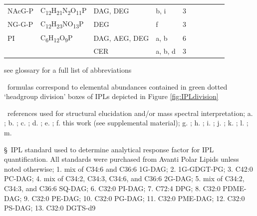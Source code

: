 \begin{landscape}
\begin{table}
\begin{adjustbox}{width=\textheight,keepaspectratio}
\begin{threeparttable}
\begin{tabular}{lrllcrrrrr}
NAcG-P & \multicolumn{1}{l}{C\textsubscript{12}H\textsubscript{21}N\textsubscript{2}O\textsubscript{11}P} & DAG, DEG & b, i  & 3     &       &       &       &       &  \\
NG-G-P & \multicolumn{1}{l}{C\textsubscript{12}H\textsubscript{23}NO\textsubscript{13}P} & DEG   & f     & 3     &       &       &       &       &  \\
PI    & \multicolumn{1}{l}{C\textsubscript{6}H\textsubscript{12}O\textsubscript{9}P} & DAG, AEG, DEG & a, b  & 6     &       &       &       &       &  \\
      &       & CER   & a, b, d & 3     &       &       &       &       &  \\
\bottomrule
\end{tabular}%


\begin{tablenotes}
\small
\item * see glossary for a full list of abbreviations
\item \dag~formulas correspond to elemental abundances contained in green dotted `headgroup division' boxes of IPLs depicted in Figure \ref{fig:IPLdivision}
\item \ddag~references used for structural elucidation and/or mass spectral interpretation; a. \cite{Sturt_Intact_2004}; b. \cite{schubotz2013spatial}
; c. \cite{Yoshinaga_Systematic_2011}; d. \cite{karlsson1998molecular}; e. \cite{ferreira1999characterization}; f. this work (see supplemental material); g. \cite{diercks2015accumulation}; h. \cite{schubotz2015stable}; i. \cite{yang2006structural}; j. \cite{wang2015improved}; k. \cite{benning1995accumulation}; l. \cite{zhang2009characterization}; m. \cite{moore2013novel}
\item \S~IPL standard used to determine analytical response factor for IPL quantification. All standards were purchased from Avanti Polar Lipids unless noted otherwise; 1. mix of C34:6 and C36:6 1G-DAG; 2. 1G-GDGT-PG; 3. C42:0 PC-DAG; 4. mix of C34:2, C34:3, C34:6, and C36:6 2G-DAG; 5. mix of C34:2, C34:3, and C36:6 SQ-DAG; 6. C32:0 PI-DAG; 7. C72:4 DPG; 8. C32:0 PDME-DAG; 9. C32:0 PE-DAG; 10. C32:0 PG-DAG; 11. C32:0 PME-DAG; 12. C32:0 PS-DAG; 13. C32:0 DGTS-d9
\normalsize
\end{tablenotes}

  \label{tab:IPL}
  \end{threeparttable}
  \end{adjustbox}
\end{table}

\end{landscape}
\doublespace



